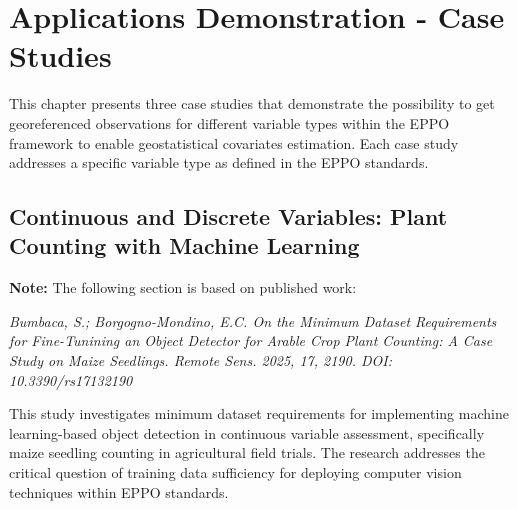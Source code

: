 \documentclass[12pt,a4paper,oneside]{report}
\begin{document}



\chapter{Applications Demonstration - Case Studies}

This chapter presents three case studies that demonstrate the possibility to get 
georeferenced observations for different variable types within the EPPO framework
to enable geostatistical covariates estimation. 
Each case study addresses a specific variable type as defined in the EPPO standards.

\section{Continuous and Discrete Variables: Plant Counting with Machine Learning}

\textbf{Note:} The following section is based on published work:

\textit{Bumbaca, S.; Borgogno-Mondino, E.C. On the Minimum Dataset Requirements for Fine-Tunining an Object Detector for Arable Crop Plant Counting: A Case Study on Maize Seedlings. Remote Sens. 2025, 17, 2190. DOI: 10.3390/rs17132190}

This study investigates minimum dataset requirements for implementing machine learning-based object detection in continuous variable assessment, specifically maize seedling counting in agricultural field trials. The research addresses the critical question of training data sufficiency for deploying computer vision techniques within EPPO standards.

%












\end{document}

